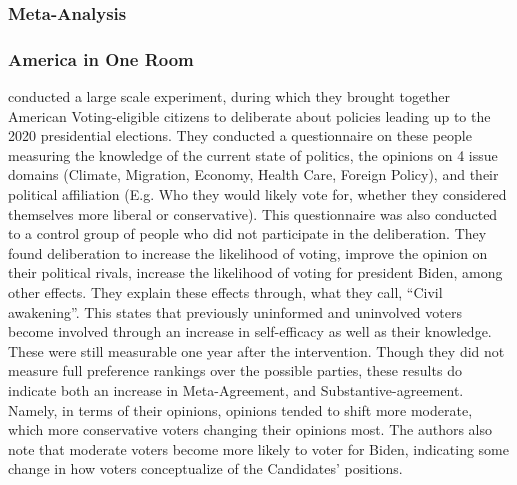 \subsubsection{Meta-Analysis}

\subsubsection{America in One Room} \citet{fishkinCanDeliberationHave2024}
conducted a large scale experiment, during which they brought together American
Voting-eligible citizens to deliberate about policies leading up to the 2020
presidential elections. They conducted a questionnaire on these people
measuring the knowledge of the current state of politics, the opinions on 4
issue domains (Climate, Migration, Economy, Health Care, Foreign Policy), and
their political affiliation (E.g. Who they would likely vote for, whether they
considered themselves more liberal or conservative). This questionnaire was
also conducted to a control group of people who did not participate in the
deliberation. They found deliberation to increase the likelihood of voting,
improve the opinion on their political rivals, increase the likelihood of
voting for president Biden, among other effects. They explain these effects
through, what they call, ``Civil awakening''. This states that previously
uninformed and uninvolved voters become involved through an increase in
self-efficacy as well as their knowledge. These were still measurable one year
after the intervention. Though they did not measure full preference rankings
over the possible parties, these results do indicate both an increase in
Meta-Agreement, and Substantive-agreement. Namely, in terms of their opinions,
opinions tended to shift more moderate, which more conservative voters changing
their opinions most. The authors also note that moderate voters become more
likely to voter for Biden, indicating some change in how voters conceptualize
of the Candidates' positions.


